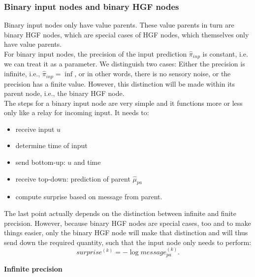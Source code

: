 \subsubsection{Binary input nodes and binary HGF nodes}
Binary input nodes only have value parents. These value parents in turn are binary HGF nodes, which are special cases of HGF nodes, which themselves only have value parents.\\

For binary input nodes, the precision of the input prediction $\hat{\pi}_{inp}$ is constant, i.e. we can treat it as a parameter. We distinguish two cases: Either the precision is infinite, i.e., $\hat{\pi}_{inp} = \inf$, or in other words, there is no sensory noise, or the precision has a finite value. However, this distinction will be made within its parent node, i.e., the binary HGF node.\\

The steps for a binary input node are very simple and it functions more or less only like a relay for incoming input. It needs to:
\begin{itemize}
    \item receive input $u$
    \item determine time of input
    \item send bottom-up: $u$ and time
    \item receive top-down: prediction of parent $\hat{\mu}_{pa}$
    \item compute surprise based on message from parent.
\end{itemize}

The last point actually depends on the distinction between infinite and finite precision. However, because binary HGF nodes are special cases, too and to make things easier, only the binary HGF node will make that distinction and will thus send down the required quantity, such that the input node only needs to perform:
\begin{equation}
    surprise^{(k)} = - \log{message_{pa}^{(k)}}.
\end{equation}



\textbf{Infinite precision}\\
\noindent


